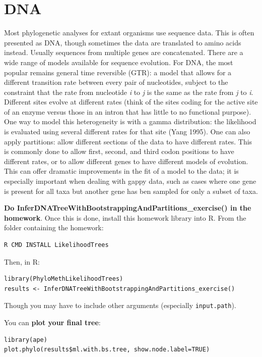 \documentclass[]{book}
\theoremstyle{definition}
\theoremstyle{definition}
\theoremstyle{remark}
\begin{document}
\section{DNA}\label{dna}

Most phylogenetic analyses for extant organisms use sequence data. This
is often presented as DNA, though sometimes the data are translated to
amino acids instead. Usually sequences from multiple genes are
concatenated. There are a wide range of models available for sequence
evolution. For DNA, the most popular remains general time reversible
(GTR): a model that allows for a different transition rate between every
pair of nucleotides, subject to the constraint that the rate from
nucleotide \emph{i} to \emph{j} is the same as the rate from \emph{j} to
\emph{i}. Different sites evolve at different rates (think of the sites
coding for the active site of an enzyme versus those in an intron that
has little to no functional purpose). One way to model this
heterogeneity is with a gamma distribution: the likelihood is evaluated
using several different rates for that site (Yang 1995). One can also
apply partitions: allow different sections of the data to have different
rates. This is commonly done to allow first, second, and third codon
positions to have different rates, or to allow different genes to have
different models of evolution. This can offer dramatic improvements in
the fit of a model to the data; it is especially important when dealing
with gappy data, such as cases where one gene is present for all taxa
but another gene has ben sampled for only a subset of taxa.

\textbf{Do InferDNATreeWithBootstrappingAndPartitions\_exercise() in the
homework}. Once this is done, install this homework library into R. From
the folder containing the homework:

\begin{verbatim}
R CMD INSTALL LikelihoodTrees
\end{verbatim}

Then, in R:

\begin{verbatim}
library(PhyloMethLikelihoodTrees)
results <- InferDNATreeWithBootstrappingAndPartitions_exercise()
\end{verbatim}

Though you may have to include other arguments (especially
\texttt{input.path}).

You can \textbf{plot your final tree}:

\begin{verbatim}
library(ape)
plot.phylo(results$ml.with.bs.tree, show.node.label=TRUE)
\end{verbatim}
\end{document}
